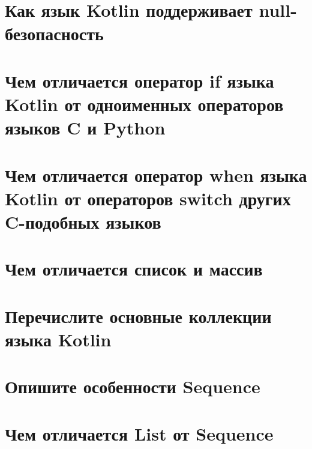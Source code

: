 \documentclass[12pt]{article}
\begin{document}
\section*{Как язык Kotlin поддерживает null-безопасность}
\begin{enumerate}[leftmargin=*]
\end{enumerate}
\vspace{2mm}
\section*{Чем отличается оператор if языка Kotlin от одноименных операторов языков C и Python}
\begin{enumerate}[leftmargin=*]
\end{enumerate}
\vspace{2mm}
\section*{Чем отличается оператор when языка Kotlin от операторов switch других C-подобных языков}
\begin{enumerate}[leftmargin=*]
\end{enumerate}
\vspace{2mm}
\section*{Чем отличается список и массив}
\begin{enumerate}[leftmargin=*]
\end{enumerate}
\vspace{2mm}
\section*{Перечислите основные коллекции языка Kotlin}
\begin{enumerate}[leftmargin=*]
\end{enumerate}
\vspace{2mm}
\section*{Опишите особенности Sequence}
\begin{enumerate}[leftmargin=*]
\end{enumerate}
\vspace{2mm}
\section*{Чем отличается List от Sequence}
\begin{enumerate}[leftmargin=*]
\end{enumerate}
\vspace{2mm}
\end{document}

